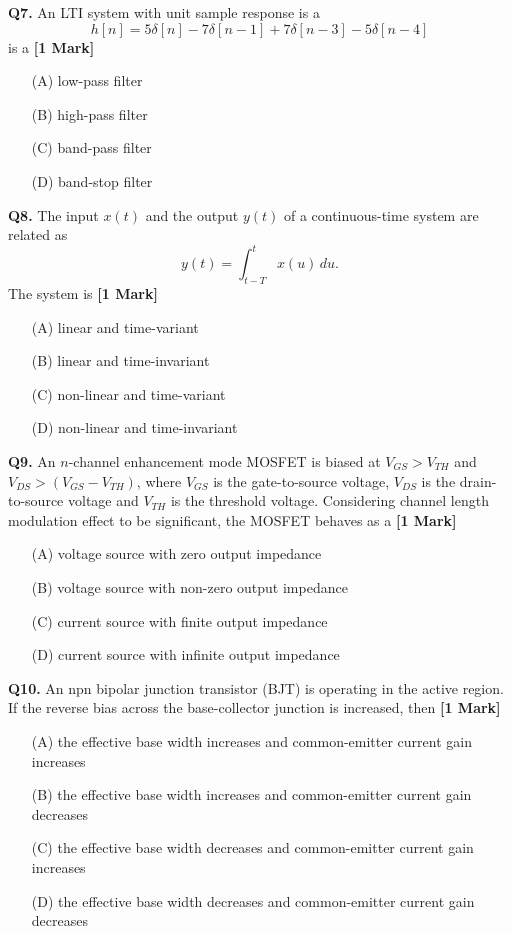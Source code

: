 \documentclass[11pt]{article}
\newcommand{\questiona}[2]{
    \noindent\textbf{Q#2.} #1 \hfill \textbf{[1 Mark]}
}
\begin{document}
\vspace{0.5cm}

\questiona{An LTI system with unit sample response is a  
\[ h[n] = 5\delta[n] - 7\delta[n-1] + 7\delta[n-3] - 5\delta[n-4] \]  
is a}{7}
\begin{enumerate}
    \item[(A)] low-pass filter
    \item[(B)] high-pass filter
    \item[(C)] band-pass filter
    \item[(D)] band-stop filter
\end{enumerate}

\vspace{0.5cm}

\questiona{The input \( x(t) \) and the output \( y(t) \) of a continuous-time system are related as  
\[ y(t) = \int_{t-T}^t x(u) \, du. \]  
The system is}{8}
\begin{enumerate}
    \item[(A)] linear and time-variant
    \item[(B)] linear and time-invariant
    \item[(C)] non-linear and time-variant
    \item[(D)] non-linear and time-invariant
\end{enumerate}

\vspace{0.5cm}

\questiona{An \( n \)-channel enhancement mode MOSFET is biased at \( V_{GS} > V_{TH} \) and \( V_{DS} > (V_{GS} - V_{TH}) \), where \( V_{GS} \) is the gate-to-source voltage, \( V_{DS} \) is the drain-to-source voltage and \( V_{TH} \) is the threshold voltage. Considering channel length modulation effect to be significant, the MOSFET behaves as a}{9}
\begin{enumerate}
    \item[(A)] voltage source with zero output impedance
    \item[(B)] voltage source with non-zero output impedance
    \item[(C)] current source with finite output impedance
    \item[(D)] current source with infinite output impedance
\end{enumerate}

\vspace{0.5cm}

\questiona{An npn bipolar junction transistor (BJT) is operating in the active region. If the reverse bias across the base-collector junction is increased, then}{10}
\begin{enumerate}
    \item[(A)] the effective base width increases and common-emitter current gain increases
    \item[(B)] the effective base width increases and common-emitter current gain decreases
    \item[(C)] the effective base width decreases and common-emitter current gain increases
    \item[(D)] the effective base width decreases and common-emitter current gain decreases
\end{enumerate}
\end{document}

